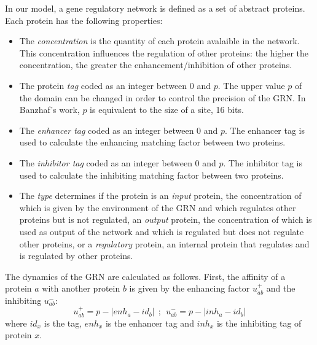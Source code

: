 In our model, a
gene regulatory network is defined as a set of abstract proteins. Each protein has the
following properties:
\begin{itemize}
\item The \emph{concentration} is the quantity of each protein avalaible in the network. This concentration influences the regulation of other proteins: the higher the concentration, the greater the enhancement/inhibition of other proteins.

\item The protein \emph{tag} coded as an integer between 0 and $p$. The
	upper value $p$ of the domain can be changed in order to control the
	precision of the GRN. In Banzhaf's work, $p$ is equivalent to the size
of a site, 16 bits. 

\item The \emph{enhancer tag} coded as an integer between 0 and $p$. The
	enhancer tag is used to calculate the enhancing matching factor
	between two proteins.

\item The \emph{inhibitor tag} coded as an integer between 0 and $p$. The
	inhibitor tag is used to calculate the inhibiting matching factor
	between two proteins.

\item The \emph{type} determines if the protein is an \emph{input} protein, the
	concentration of which is given by the environment of the GRN and which
	regulates other proteins but is not regulated, an \emph{output} protein,
	the concentration of which is used as output of the network and which is
	regulated but does not regulate other proteins, or a \emph{regulatory}
	protein, an internal protein that regulates and is regulated by other
	proteins.

\end{itemize}

The dynamics of the GRN are calculated as follows. First, the affinity of a
protein $a$ with another protein $b$ is given by the enhancing factor
$u^{+}_{ab}$ and the inhibiting $u^{-}_{ab}$:
\begin{equation}
u^{+}_{ab}=p-|enh_a-id_b|~~;~~u^{-}_{ab}=p-|inh_a-id_b|
\end{equation}
where $id_x$ is the tag, $enh_x$ is the enhancer tag and $inh_x$
is the inhibiting tag of protein $x$.


